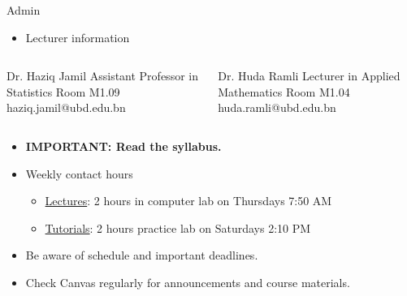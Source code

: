 \documentclass[,aspectratio=169]{beamer}
\newenvironment{Shaded}{\begin{snugshade}}{\end{snugshade}}
\newcommand{\NormalTok}[1]{#1}
\providecommand{\tightlist}{%
  \setlength{\itemsep}{0pt}\setlength{\parskip}{0pt}}
\begin{document}
\begin{frame}[fragile]{Admin}
\protect\hypertarget{admin-1}{}
\begin{itemize}
\tightlist
\item
  Lecturer information
\end{itemize}

\vspace{-1.5em}

\begin{columns}[T]
\begin{column}{0.45\textwidth}
\footnotesize

\begin{Shaded}
\begin{Highlighting}[]
\NormalTok{Dr. Haziq Jamil}
\NormalTok{Assistant Professor in Statistics}
\NormalTok{Room M1.09}
\NormalTok{haziq.jamil@ubd.edu.bn}
\end{Highlighting}
\end{Shaded}
\end{column}

\begin{column}{0.45\textwidth}
\footnotesize

\begin{Shaded}
\begin{Highlighting}[]
\NormalTok{Dr. Huda Ramli}
\NormalTok{Lecturer in Applied Mathematics}
\NormalTok{Room M1.04}
\NormalTok{huda.ramli@ubd.edu.bn}
\end{Highlighting}
\end{Shaded}
\end{column}
\end{columns}

\vspace{0.5em}

\begin{itemize}
\item
  \textcolor{solidpink}{\textbf{IMPORTANT: Read the syllabus.}}
\item
  Weekly contact hours

  \begin{itemize}
  \tightlist
  \item
    \underline{Lectures}: 2 hours in computer lab on Thursdays 7:50 AM
  \item
    \underline{Tutorials}: 2 hours practice lab on Saturdays 2:10 PM
  \end{itemize}
\item
  Be aware of schedule and important deadlines.
\item
  Check Canvas regularly for announcements and course materials.
\end{itemize}
\end{frame}
\end{document}
